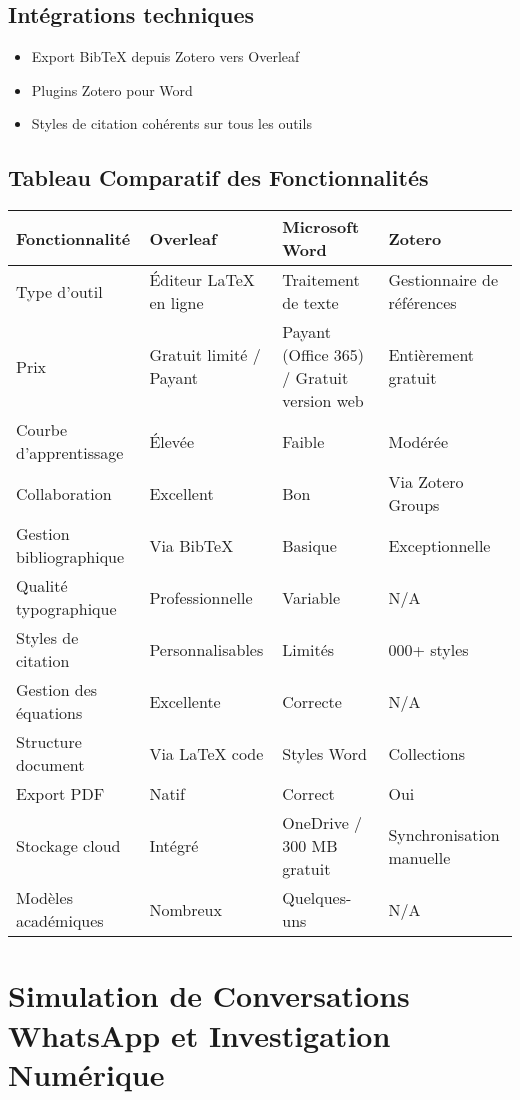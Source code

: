 \documentclass[12pt]{article}
\begin{document}
\begin{center}
\subsection*{ Intégrations techniques}
\begin{itemize}[leftmargin=*, label=\textbullet]
    \item Export BibTeX depuis Zotero vers Overleaf
    \item Plugins Zotero pour Word
    \item Styles de citation cohérents sur tous les outils
\end{itemize}

\subsection{ Tableau Comparatif des Fonctionnalités}

\begin{tabular}{|>{\raggedright}p{4cm}|>{\raggedright}p{3.5cm}|>{\raggedright}p{3.5cm}|>{\raggedright\arraybackslash}p{3.5cm}|}
\hline
\textbf{Fonctionnalité} & \textbf{Overleaf} & \textbf{Microsoft Word} & \textbf{Zotero} \\
\hline
Type d'outil & Éditeur LaTeX en ligne & Traitement de texte & Gestionnaire de références \\
Prix & Gratuit limité / Payant & Payant (Office 365) / Gratuit version web & Entièrement gratuit \\
Courbe d'apprentissage & Élevée & Faible & Modérée \\
Collaboration & Excellent & Bon & Via Zotero Groups \\
Gestion bibliographique & Via BibTeX & Basique & Exceptionnelle \\
Qualité typographique & Professionnelle & Variable & N/A \\
Styles de citation & Personnalisables & Limités & 10 000+ styles \\
Gestion des équations & Excellente & Correcte & N/A \\
Structure document & Via LaTeX code & Styles Word & Collections \\
Export PDF & Natif & Correct & Oui \\
Stockage cloud & Intégré & OneDrive / 300 MB gratuit & Synchronisation manuelle \\
Modèles académiques & Nombreux & Quelques-uns & N/A \\
\hline
\end{tabular}

\section{Simulation de Conversations WhatsApp et Investigation Numérique}


\end{center}
\end{document}

